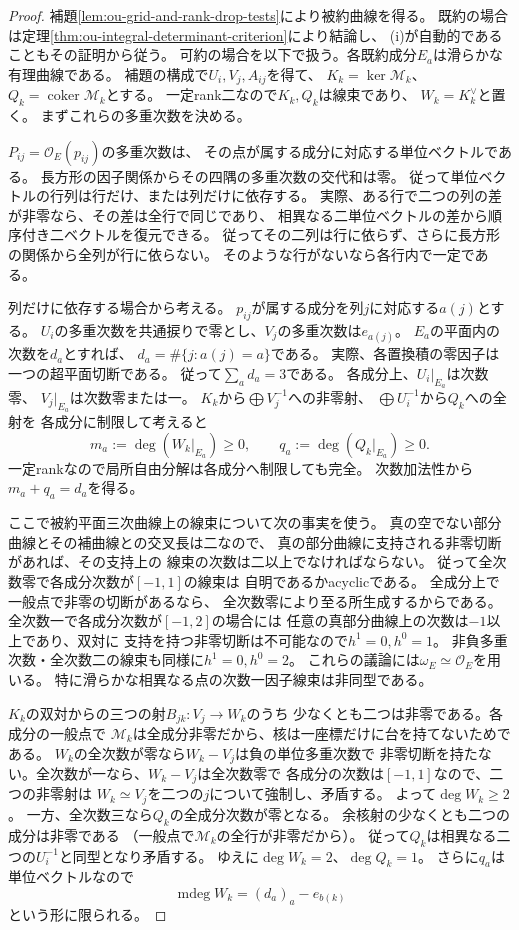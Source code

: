 \begin{proof}
補題\ref{lem:ou-grid-and-rank-drop-tests}により被約曲線を得る。
既約の場合は定理\ref{thm:ou-integral-determinant-criterion}により結論し、
(i)が自動的であることもその証明から従う。
可約の場合を以下で扱う。各既約成分$E_a$は滑らかな有理曲線である。
補題の構成で$U_i,V_j,A_{ij}$を得て、
$K_k=\ker\mathscr M_k$、$Q_k=\operatorname{coker}\mathscr M_k$とする。
一定rank二なので$K_k,Q_k$は線束であり、
$W_k=K_k^\vee$と置く。
まずこれらの多重次数を決める。

$P_{ij}=\mathcal O_E(p_{ij})$の多重次数は、
その点が属する成分に対応する単位ベクトルである。
長方形の因子関係からその四隅の多重次数の交代和は零。
従って単位ベクトルの行列は行だけ、または列だけに依存する。
実際、ある行で二つの列の差が非零なら、その差は全行で同じであり、
相異なる二単位ベクトルの差から順序付き二ベクトルを復元できる。
従ってその二列は行に依らず、さらに長方形の関係から全列が行に依らない。
そのような行がないなら各行内で一定である。

列だけに依存する場合から考える。
$p_{ij}$が属する成分を列$j$に対応する$a(j)$とする。
$U_i$の多重次数を共通捩りで零とし、$V_j$の多重次数は$e_{a(j)}$。
$E_a$の平面内の次数を$d_a$とすれば、
$d_a=\#\{j:a(j)=a\}$である。
実際、各置換積の零因子は一つの超平面切断である。
従って$\sum_a d_a=3$である。
各成分上、$U_i|_{E_a}$は次数零、
$V_j|_{E_a}$は次数零または一。
$K_k$から$\bigoplus V_j^{-1}$への非零射、
$\bigoplus U_i^{-1}$から$Q_k$への全射を
各成分に制限して考えると
\[
 m_a:=\deg(W_k|_{E_a})\geq0,\qquad
 q_a:=\deg(Q_k|_{E_a})\geq0.
\]
一定rankなので局所自由分解は各成分へ制限しても完全。
次数加法性から$m_a+q_a=d_a$を得る。

ここで被約平面三次曲線上の線束について次の事実を使う。
真の空でない部分曲線とその補曲線との交叉長は二なので、
真の部分曲線に支持される非零切断があれば、その支持上の
線束の次数は二以上でなければならない。
従って全次数零で各成分次数が$[-1,1]$の線束は
自明であるかacyclicである。
全成分上で一般点で非零の切断があるなら、
全次数零により至る所生成するからである。
全次数一で各成分次数が$[-1,2]$の場合には
任意の真部分曲線上の次数は$-1$以上であり、双対に
支持を持つ非零切断は不可能なので$h^1=0,h^0=1$。
非負多重次数・全次数二の線束も同様に$h^1=0,h^0=2$。
これらの議論には$\omega_E\simeq\mathcal O_E$を用いる。
特に滑らかな相異なる点の次数一因子線束は非同型である。

$K_k$の双対からの三つの射$B_{jk}:V_j\to W_k$のうち
少なくとも二つは非零である。各成分の一般点で
$\mathscr M_k$は全成分非零だから、核は一座標だけに台を持てないためである。
$W_k$の全次数が零なら$W_k-V_j$は負の単位多重次数で
非零切断を持たない。全次数が一なら、$W_k-V_j$は全次数零で
各成分の次数は$[-1,1]$なので、二つの非零射は
$W_k\simeq V_j$を二つの$j$について強制し、矛盾する。
よって$\deg W_k\geq2$。
一方、全次数三なら$Q_k$の全成分次数が零となる。
余核射の少なくとも二つの成分は非零である
（一般点で$\mathscr M_k$の全行が非零だから）。
従って$Q_k$は相異なる二つの$U_i^{-1}$と同型となり矛盾する。
ゆえに$\deg W_k=2$、$\deg Q_k=1$。
さらに$q_a$は単位ベクトルなので
\[
 \operatorname{mdeg}W_k=(d_a)_a-e_{b(k)}
\]
という形に限られる。


\end{proof}
